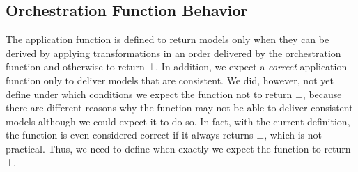 




\subsection{Orchestration Function Behavior} %
\label{chap:orchestration:problem:function_behavior}

The application function is defined to return models only when they can be derived by applying transformations in an order delivered by the orchestration function and otherwise to return $\bot$.
In addition, we expect a \emph{correct} application function only to deliver models that are consistent.
We did, however, not yet define under which conditions we expect the function not to return $\bot$, because there are different reasons why the function may not be able to deliver consistent models although we could expect it to do so.
In fact, with the current definition, the function is even considered correct if it always returns $\bot$, which is not practical.
Thus, we need to define when exactly we expect the function to return $\bot$.

